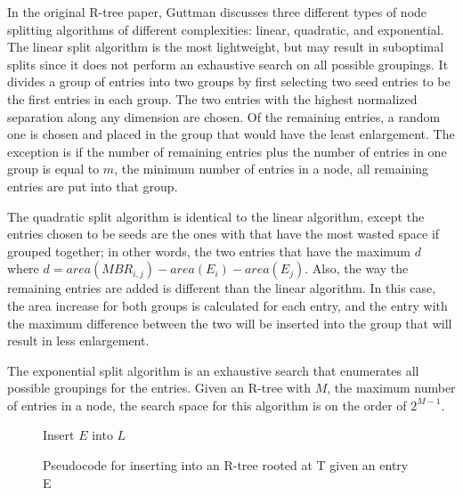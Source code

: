 In the original R-tree paper, Guttman discusses three different types of node 
splitting algorithms of different complexities: linear, quadratic, and 
exponential. The linear split algorithm is the most lightweight, but may
result in suboptimal splits since it does not perform an exhaustive search on
all possible groupings. It divides a group of entries into two groups by first 
selecting two seed entries to be the first entries in each group. The two 
entries with the highest normalized separation along any dimension are chosen.
Of the remaining entries, a random one is chosen and placed in the group that 
would have the least enlargement. The exception is if the number of remaining 
entries plus the number of entries in one group is equal to $m$, the minimum 
number of entries in a node, all remaining entries are put into that group. 

The quadratic split algorithm is identical to the linear algorithm, except the 
entries chosen to be seeds are the ones with that have the most wasted space
if grouped together; in other words, the two entries that have the maximum $d$
where $d = area(MBR_{i,j}) - area(E_{i}) - area(E_{j}) $.
Also, the way the remaining entries are added is different than the linear 
algorithm. In this case, the area increase for both groups is calculated for each
entry, and the entry with the maximum difference between the two will be inserted 
into the group that will result in less enlargement.

The exponential split algorithm is an exhaustive search that enumerates all possible
groupings for the entries. Given an R-tree with $M$, the maximum number of entries
in a node, the search space for this algorithm is on the order of $2^{M-1}$.

\begin{figure}[t]
\begin{algorithmic}
		\State {}
			\State Insert $E$ into $L$
		\Else
			\State {}
		\EndIf
		\State {}
	\EndFunction
\end{algorithmic}
\caption{Pseudocode for inserting into an R-tree rooted at T given an entry E}
\label{fig:R_Tree_Insert}
\end{figure}

